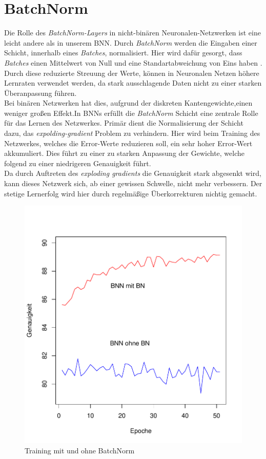 \section{BatchNorm}
Die Rolle des \textit{BatchNorm-Layers} in nicht-binären Neuronalen-Netzwerken ist eine leicht andere als in unserem BNN. Durch \textit{BatchNorm} werden die Eingaben einer Schicht, innerhalb eines \textit{Batches}, normalisiert. Hier wird dafür gesorgt, dass \textit{Batches} einen Mittelwert von Null und eine Standartabweichung von Eins haben\cite{batchnorm} .\\ 
Durch diese reduzierte Streuung der Werte, können in Neuronalen Netzen höhere Lernraten verwendet werden, da stark ausschlagende Daten nicht zu einer starken Überanpassung führen.\\
Bei binären Netzwerken hat dies, aufgrund der diskreten Kantengewichte,einen weniger großen Effekt.In BNNs erfüllt die \textit{BatchNorm} Schicht eine zentrale Rolle für das Lernen des Netzwerkes. Primär dient die Normalisierung der Schicht dazu, das \textit{expolding-gradient} Problem zu verhindern. Hier wird beim Training des Netzwerkes, welches die Error-Werte reduzieren soll, ein sehr hoher Error-Wert akkumuliert. Dies führt zu einer zu starken Anpassung der Gewichte, welche folgend zu einer niedrigeren Genauigkeit führt\cite{DBLP:journals/corr/abs-1909-09139}.\\
 Da durch Auftreten des \textit{exploding gradients} die Genauigkeit stark abgesenkt wird, kann dieses Netzwerk sich, ab einer gewissen Schwelle, nicht mehr verbessern. Der stetige Lernerfolg wird hier durch regelmäßige Überkorrekturen nichtig gemacht.
\begin{figure}[H]
	\centering
	\includegraphics[scale=0.7]{./bilder/_plot_batchnorm}
	\caption{Training mit und ohne BatchNorm}
	\label{fig:bn}
\end{figure}
